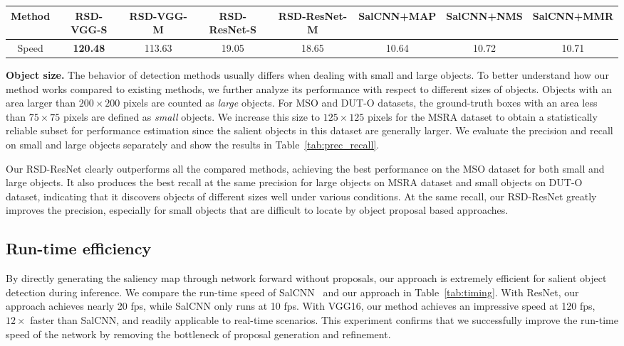 \documentclass[10pt,twocolumn,letterpaper]{article}
\begin{document}
%
\begin{table*}[!h]
  \centering
  \footnotesize
  \caption{The run-time speed (in fps) of our RSD and compared methods during inference. Our methods with suffix ``S'' are for single salient object detection, while the ones with suffix ``M'' are for multiple salient object detection.}
    \begin{tabular}{c|ccccccc}
    \hline
    {Method} & RSD-VGG-S & RSD-VGG-M & RSD-ResNet-S & RSD-ResNet-M & SalCNN+MAP   & SalCNN+NMS   & SalCNN+MMR \\
    \hline
    Speed & \textbf{120.48} & 113.63 & 19.05  & 18.65 & 10.64 & 10.72 & 10.71 \\
    \hline
    \end{tabular}%
  \label{tab:timing}%
\end{table*}
%
{\flushleft \textbf{Object size.}} The behavior of detection methods usually differs when dealing with small and large objects. To better understand how our method works compared to existing methods, we further analyze its performance with respect to different sizes of objects. Objects with an area larger than $200\times200$ pixels are counted as \emph{large} objects. For MSO and DUT-O datasets, the ground-truth boxes with an area less than $75\times75$ pixels are defined as \emph{small} objects. We increase this size to $125\times125$ pixels for the MSRA dataset to obtain a statistically reliable subset for performance estimation since the salient objects in this dataset are generally larger. 
We evaluate the precision and recall on small and large objects separately and show the results in Table~\ref{tab:prec_recall}.

Our RSD-ResNet clearly outperforms all the compared methods, achieving the best performance on the MSO dataset for both small and large objects. It also produces the best recall at the same precision for large objects on MSRA dataset and small objects on DUT-O dataset, indicating that it discovers objects of different sizes well under various conditions. At the same recall, our RSD-ResNet greatly improves the precision, especially for small objects that are difficult to locate by object proposal based approaches.
%

\subsection{Run-time efficiency}
By directly generating the saliency map through network forward without proposals, our approach is extremely efficient for salient object detection during inference. We compare the run-time speed of SalCNN~\cite{zhang2015SOD} and our approach in Table~\ref{tab:timing}. With ResNet, our approach achieves nearly 20 fps, while SalCNN only runs at 10 fps. With VGG16, our method achieves an impressive speed at 120 fps, $12\times$ faster than SalCNN, and readily applicable to real-time scenarios.
This experiment confirms that we successfully improve the run-time speed of the network by removing the bottleneck of proposal generation and refinement.
\end{document}
